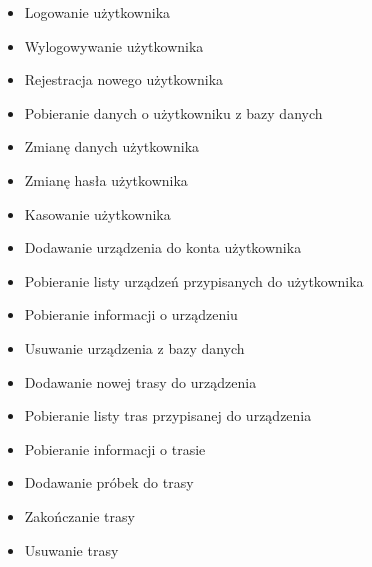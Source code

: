 \begin{itemize}
\item Logowanie użytkownika
\item Wylogowywanie użytkownika
\item Rejestracja nowego użytkownika
\item Pobieranie danych o użytkowniku z bazy danych
\item Zmianę danych użytkownika
\item Zmianę hasła użytkownika
\item Kasowanie użytkownika
\item Dodawanie urządzenia do konta użytkownika
\item Pobieranie listy urządzeń przypisanych do użytkownika
\item Pobieranie informacji o urządzeniu
\item Usuwanie urządzenia z bazy danych
\item Dodawanie nowej trasy do urządzenia
\item Pobieranie listy tras przypisanej do urządzenia
\item Pobieranie informacji o trasie
\item Dodawanie próbek do trasy
\item Zakończanie trasy
\item Usuwanie trasy
\end{itemize}